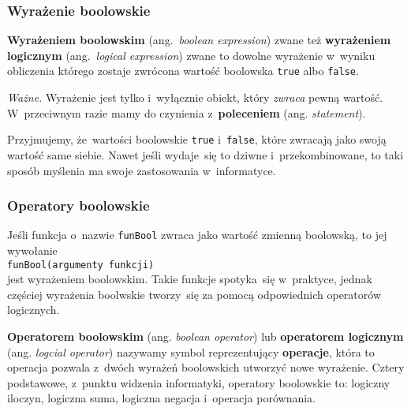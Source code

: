 \documentclass[10pt,t]{beamer}
\begin{document}
\begin{frame}
  \frametitle{Wyrażenie boolowskie}


  \textbf{Wyrażeniem boolowskim} (ang.~\textit{boolean expression}) zwane
  też \textbf{wyrażeniem logicznym} (ang.~\textit{logical expression})
  zwane  to dowolne wyrażenie w~wyniku obliczenia którego zostaje zwrócona
  wartość boolowska \texttt{true} albo \texttt{false}.

  \textit{Ważne.} Wyrażenie jest tylko i~wyłącznie obiekt, który
  \textit{zwraca} pewną wartość. W~przeciwnym razie mamy do czynienia
  z~\textbf{poleceniem} (ang. \textit{statement}).

  Przyjmujemy, że~wartości boolowskie \texttt{true} i~\texttt{false}, które
  zwracają jako swoją wartość same siebie. Nawet jeśli wydaje~się to dziwne
  i~przekombinowane, to taki sposób myślenia ma swoje zastosowania
  w~informatyce.

\end{frame}





\begin{frame}
  \frametitle{Operatory boolowskie}


  Jeśli funkcja o~nazwie \texttt{funBool} zwraca jako wartość zmienną
  boolowską, to jej wywołanie \\
  \texttt{funBool(argumenty funkcji)} \\
  jest wyrażeniem boolowskim. Takie funkcje spotyka~się w~praktyce, jednak
  częściej wyrażenia boolwskie tworzy~się za pomocą odpowiednich operatorów
  logicznych.

  \textbf{Operatorem boolowskim} (ang. \textit{boolean operator}) lub
  \textbf{operatorem logicznym} (ang. \textit{logcial operator})
  nazywamy symbol reprezentujący \textbf{operacje}, która to operacja
  pozwala z~dwóch wyrażeń boolowskich utworzyć nowe wyrażenie. Cztery
  podstawowe, z~punktu widzenia informatyki, operatory boolowskie to:
  logiczny iloczyn, logiczna suma, logiczna negacja i~operacja porównania.

\end{frame}
\end{document}
